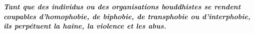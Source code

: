 \documentclass[12pt,openany]{book}
\renewenvironment{quote}{%
  \list{}{%
    \leftmargin-0.1cm   %
    \rightmargin\leftmargin
  }
  \item\relax
}
{\endlist}
\begin{document}
\newpage
\thispagestyle{empty}

\rmfamily

\begin{center}\end{center}
\begin{center}

\vfill
\color{gray}

\vfill

\end{center}

\begin{figure}[h]
    \centering
\end{figure}

\thispagestyle{empty}

\begin{figure}[h]
\end{figure}

\thispagestyle{empty}

\mainmatter
\newpage
\thispagestyle{empty}
\color{darkgray}
\begingroup
\begin{quote}
\doublespacing
\centering
\textit{\Large \textbf{Tant que des individus ou des organisations bouddhistes se rendent coupables d'homophobie, de biphobie, de transphobie ou d'interphobie, ils perpétuent la haine, la violence et les abus.}}
\end{quote}
\endgroup
\end{document}
